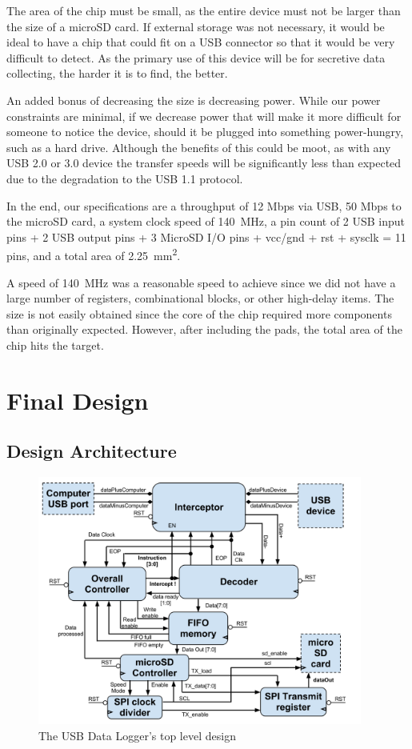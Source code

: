 \documentclass[12pt,letter,oneside]{report}
\begin{document}
The area of the chip must be small, as the entire device must not be larger than the size of a microSD card. If external storage was not necessary, it would be ideal to have a chip that could fit on a USB connector so that it would be very difficult to detect. As the primary use of this device will be for secretive data collecting, the harder it is to find, the better.

An added bonus of decreasing the size is decreasing power. While our power constraints are minimal, if we decrease power that will make it more difficult for someone to notice the device, should it be plugged into something power-hungry, such as a hard drive. Although the benefits of this could be moot, as with any USB 2.0 or 3.0 device the transfer speeds will be significantly less than expected due to the degradation to the USB 1.1 protocol.

In the end, our specifications are a throughput of 12 Mbps via USB, 50 Mbps to the microSD card, a system clock speed of \SI{140}{\mega\hertz}, a pin count of 2 USB input pins + 2 USB  output pins + 3 MicroSD I/O pins + vcc/gnd + rst + sysclk = 11 pins, and a total area of \SI{2.25}{\milli\meter\squared}.

A speed of \SI{140}{\mega\hertz} was a reasonable speed to achieve since we did not have a large number of registers, combinational blocks, or other high-delay items.  The size is not easily obtained since the core of the chip required more components than originally expected. However, after including the pads, the total area of the chip hits the target.
\chapter{Final Design}
\section{Design Architecture}
\begin{figure}[h]
	\caption{The USB Data Logger's top level design}
	\begin{center}
		\includegraphics[width=0.95\textwidth]{topLevel}
	\end{center}
\end{figure}
\pagebreak
\end{document}
